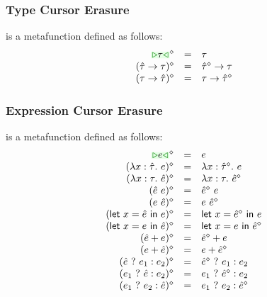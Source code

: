 \documentclass{article}
\begin{document}
\subsubsection{Type Cursor Erasure}
\judgbox{\ensuremath{\cursorErase{\ZTMV}}} is a metafunction defined as follows:
%
\newcommand{\cursorErasesToRow}[2]{\ensuremath{\cursorErase{#1} & = & #2}}
\[\begin{array}{rcl}
  \cursorErasesToRow{\ZTCursor{\TMV}}{\TMV} \\
  \cursorErasesToRow{(\ZTArrowL{\ZTMV}{\TMV})}{\TArrow{\cursorErase{\ZTMV}}{\TMV}} \\
  \cursorErasesToRow{(\ZTArrowR{\TMV}{\ZTMV})}{\TArrow{\TMV}{\cursorErase{\ZTMV}}} \\
\end{array}\]

\subsubsection{Expression Cursor Erasure}
\judgbox{\ensuremath{\cursorErase{\ZMV}}} is a metafunction defined as follows:
%
\[\begin{array}{rcl}
  \cursorErasesToRow{\ZCursor{\EMV}}{\EMV} \\
  \cursorErasesToRow{(\ZLamT{x}{\ZTMV}{\EMV})}{\ELam{x}{\cursorErase{\ZTMV}}{\EMV}} \\
  \cursorErasesToRow{(\ZLamE{x}{\TMV}{\ZMV})}{\ELam{x}{\TMV}{\cursorErase{\ZMV}}} \\
  \cursorErasesToRow{(\ZApL{\ZMV}{\EMV})}{\EAp{\cursorErase{\ZMV}}{\EMV}} \\
  \cursorErasesToRow{(\ZApR{\EMV}{\ZMV})}{\EAp{\EMV}{\cursorErase{\ZMV}}} \\
  \cursorErasesToRow{(\ZLetL{x}{\ZMV}{\EMV})}{\ELet{x}{\cursorErase{\ZMV}}{\EMV}} \\
  \cursorErasesToRow{(\ZLetR{x}{\EMV}{\ZMV})}{\ELet{x}{\EMV}{\cursorErase{\ZMV}}} \\
  \cursorErasesToRow{(\ZPlusL{\ZMV}{\EMV})}{\EPlus{\cursorErase{\ZMV}}{\EMV}} \\
  \cursorErasesToRow{(\ZPlusR{\EMV}{\ZMV})}{\EPlus{\EMV}{\cursorErase{\ZMV}}} \\
  \cursorErasesToRow{(\ZIfC{\ZMV}{\EMV_1}{\EMV_2})}{\EIf{\cursorErase{\ZMV}}{\EMV_1}{\EMV_2}} \\
  \cursorErasesToRow{(\ZIfL{\EMV_1}{\ZMV}{\EMV_2})}{\EIf{\EMV_1}{\cursorErase{\ZMV}}{\EMV_2}} \\
  \cursorErasesToRow{(\ZIfL{\EMV_1}{\EMV_2}{\ZMV})}{\EIf{\EMV_1}{\EMV_2}{\cursorErase{\ZMV}}} \\
\end{array}\]
\end{document}
